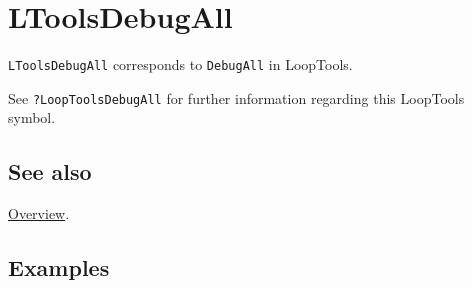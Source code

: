 \documentclass[../FeynHelpersManual.tex]{subfiles}
\begin{document}
\hypertarget{ltoolsdebugall}{
\section{LToolsDebugAll}\label{ltoolsdebugall}}

\texttt{LToolsDebugAll} corresponds to \texttt{DebugAll} in LoopTools.

See \texttt{?LoopTools\textasciigrave DebugAll} for further information
regarding this LoopTools symbol.

\subsection{See also}

\hyperlink{toc}{Overview}.

\subsection{Examples}
\end{document}
